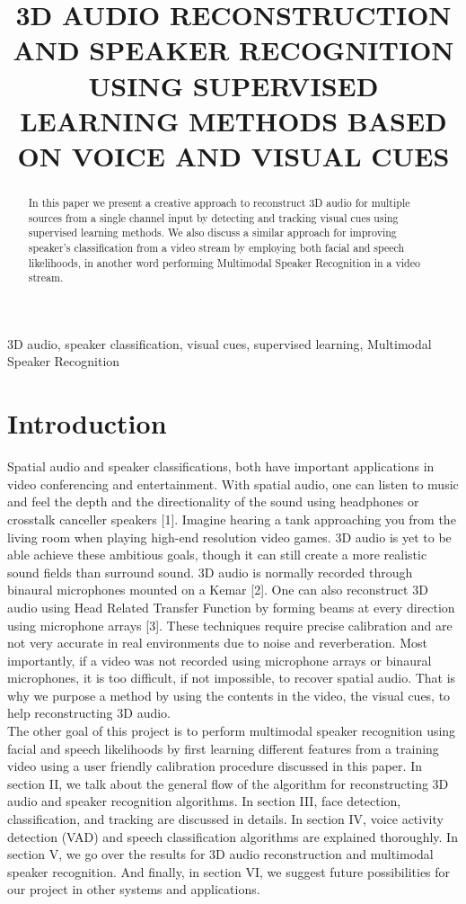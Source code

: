 \documentclass{article}
\title{3D AUDIO RECONSTRUCTION AND SPEAKER RECOGNITION USING SUPERVISED LEARNING METHODS BASED ON VOICE AND VISUAL CUES}
\begin{document}
%
\maketitle
%
\begin{abstract}
In this paper we present a creative approach to reconstruct 3D audio for multiple sources from a single channel input by detecting and tracking visual cues using supervised learning methods. We also discuss a similar approach for improving speaker's classification from a video stream by employing both facial and speech likelihoods, in another word performing Multimodal Speaker Recognition in a video stream. 
\end{abstract}
%
\begin{keywords}
3D audio, speaker classification, visual cues, supervised learning, Multimodal Speaker Recognition
\end{keywords}
%
\section{Introduction}
\label{sec:intro}

Spatial audio and speaker classifications, both have important applications in video conferencing and entertainment. With spatial audio, one can listen to music and feel the depth and the directionality of the sound using headphones or crosstalk canceller speakers [1]. Imagine hearing a tank approaching you from the living room when playing high-end resolution video games. 3D audio is yet to be able achieve these ambitious goals, though it can still create a more realistic sound fields than surround sound. 3D audio is normally recorded through binaural microphones mounted on a Kemar [2]. One can also reconstruct 3D audio using Head Related Transfer Function by forming beams at every direction using microphone arrays [3]. These techniques require precise calibration and are not very accurate in real environments due to noise and reverberation. Most importantly, if a video was not recorded using microphone arrays or binaural microphones, it is too difficult, if not impossible, to recover spatial audio. That is why we purpose a method by using the contents in the video, the visual cues, to help reconstructing 3D audio. 
\\
The other goal of this project is to perform multimodal speaker recognition using facial and speech likelihoods by first learning different features from a training video using a user friendly calibration procedure discussed in this paper. In section II, we talk about the general flow of the algorithm for reconstructing 3D audio and speaker recognition algorithms. In section III, face detection, classification, and tracking are discussed in details. In section IV, voice activity detection (VAD) and speech classification algorithms are explained thoroughly. In section V, we go over the results for 3D audio reconstruction and multimodal speaker recognition. And finally, in section VI, we suggest future possibilities for our project in other systems and applications. 
\end{document}
